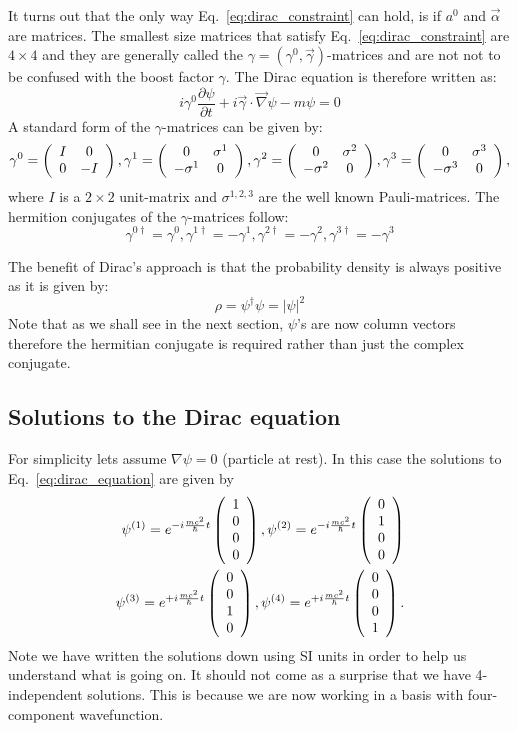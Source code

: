 It turns out that the only way Eq.~\ref{eq:dirac_constraint} can hold, is if $a^0$ and $\vec{\alpha}$ are matrices. The smallest size matrices that satisfy Eq.~\ref{eq:dirac_constraint} are $4\times4$ and they are generally called the $\gamma=(\gamma^0,\vec{\gamma})$-matrices and are not not to be confused with the boost factor $\gamma$.
The Dirac equation is therefore written as:
\begin{equation}
\label{eq:dirac_equation}
i\gamma^0\frac{\partial\psi}{\partial t}+i\vec{\gamma}\cdot \vec{\nabla}\psi-m\psi=0
\end{equation}
A standard form of the $\gamma$-matrices can be given by:
\begin{equation}
\gamma^0= \left( \begin{array}{cc} I & 0 \\ 0 & -I \end{array} \right), \gamma^1= \left( \begin{array}{cc} 0 & \sigma^1 \\ -\sigma^1 & 0 \end{array} \right),
\gamma^2= \left( \begin{array}{cc} 0 & \sigma^2 \\ -\sigma^2 & 0 \end{array} \right),
\gamma^3= \left( \begin{array}{cc} 0 & \sigma^3 \\ -\sigma^3 & 0 \end{array} \right),
\end{equation}
where $I$ is a $2\times2$ unit-matrix and $\sigma^{1,2,3}$ are the well known Pauli-matrices.
The hermition conjugates of the $\gamma$-matrices follow:
\begin{equation}
\gamma^{0\dagger}=\gamma^0,\gamma^{1\dagger}=-\gamma^1,\gamma^{2\dagger}=-\gamma^2,\gamma^{3\dagger}=-\gamma^3
\end{equation}

The benefit of Dirac's approach is that the probability density is always positive as it is given by:
\[
\rho=\psi^\dagger\psi=|\psi|^2
\]
Note that as we shall see in the next section, $\psi$'s are now column vectors therefore the hermitian conjugate is required rather than just the complex conjugate.


\subsection{Solutions to the Dirac equation}
For simplicity lets assume $\nabla\psi=0$ (particle at rest). In this case the solutions to Eq.~\ref{eq:dirac_equation} are given by
\begin{eqnarray}
\psi^{(1)}=e^{-i\frac{mc^2}{\hbar}t} \left( \begin{array}{c} 1 \\ 0 \\ 0 \\ 0\end{array} \right),
\psi^{(2)}=e^{-i\frac{mc^2}{\hbar}t} \left( \begin{array}{c} 0 \\ 1 \\ 0 \\ 0\end{array} \right)\\
\psi^{(3)}=e^{+i\frac{mc^2}{\hbar}t} \left( \begin{array}{c} 0 \\ 0 \\ 1 \\ 0\end{array} \right),
\psi^{(4)}=e^{+i\frac{mc^2}{\hbar}t} \left( \begin{array}{c} 0 \\ 0 \\ 0 \\ 1\end{array} \right).
\end{eqnarray}
Note we have written the solutions down using SI units in order to help us understand what is going on.
It should not come as a surprise that we have 4-independent solutions. This is because we are now working
in a basis with four-component wavefunction.

